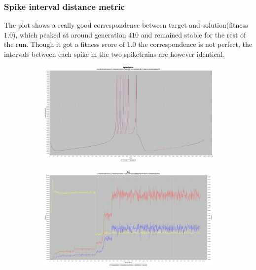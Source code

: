 \documentclass[10pt]{article}
\begin{document}
		\subsubsection{Spike interval distance metric}
			The plot shows a really good correspondence between target and solution(fitness $1.0$), which peaked at around generation $410$ and remained stable for the rest of the run. Though it got a fitness score of $1.0$ the correspondence is not perfect, the intervals between each spike in the two spiketrains are however identical.
			\begin{figure}[H]
				\centering
					\begin{subfigure}{.5\textwidth}
						\centering
						\includegraphics[width=\linewidth]{./../images/izzy1/interval/plot.png}
						
						\label{fig:sub2a}
					\end{subfigure}%
					\begin{subfigure}{.5\textwidth}
						\centering
						\includegraphics[width=\linewidth]{./../images/izzy1/interval/prog.png}
						
						\label{fig:sub2b}
					\end{subfigure}
					
					\label{fig:plot2}
			\end{figure}
		
\end{document}
